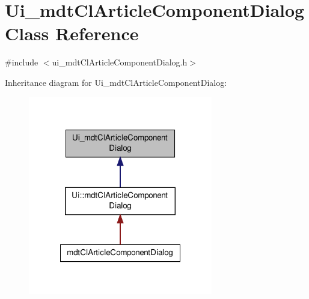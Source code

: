 \hypertarget{class_ui__mdt_cl_article_component_dialog}{\section{Ui\-\_\-mdt\-Cl\-Article\-Component\-Dialog Class Reference}
\label{class_ui__mdt_cl_article_component_dialog}
}


{\ttfamily \#include $<$ui\-\_\-mdt\-Cl\-Article\-Component\-Dialog.\-h$>$}



Inheritance diagram for Ui\-\_\-mdt\-Cl\-Article\-Component\-Dialog\-:
\nopagebreak
\begin{figure}[H]
\begin{center}
\leavevmode
\includegraphics[width=228pt]{class_ui__mdt_cl_article_component_dialog__inherit__graph}
\end{center}
\end{figure}


